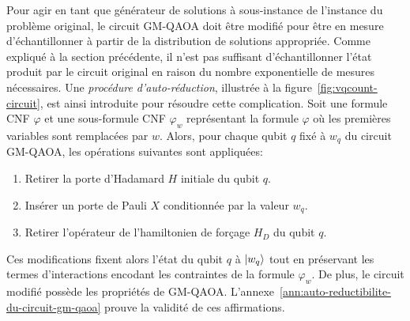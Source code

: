 Pour agir en tant que générateur de solutions à sous-instance de l'instance du problème original, le circuit GM-QAOA doit être modifié pour être en mesure d'échantillonner à partir de la distribution de solutions appropriée. Comme expliqué à la section précédente, il n'est pas suffisant d'échantillonner l'état produit par le circuit original en raison du nombre exponentielle de mesures nécessaires. Une \textit{procédure d'auto-réduction}, illustrée à la figure~\ref{fig:vqcount-circuit}, est ainsi introduite pour résoudre cette complication. Soit une formule CNF $\varphi$ et une sous-formule CNF $\varphi_{w}$ représentant la formule $\varphi$ où les premières variables sont remplacées par $w$. Alors, pour chaque qubit $q$ fixé à $w_{q}$ du circuit GM-QAOA, les opérations suivantes sont appliquées:

\begin{enumerate}[(1)]
    \item Retirer la porte d'Hadamard $H$ initiale du qubit $q$.
    \item Insérer un porte de Pauli $X$ conditionnée par la valeur $w_{q}$.
    \item Retirer l'opérateur de l'hamiltonien de forçage $H_{D}$ du qubit $q$.
\end{enumerate}

Ces modifications fixent alors l'état du qubit $q$ à $\ket{w_{q}}$ tout en préservant les termes d'interactions encodant les contraintes de la formule $\varphi_{w}$. De plus, le circuit modifié possède les propriétés de GM-QAOA. L'annexe~\ref{ann:auto-reductibilite-du-circuit-gm-qaoa} prouve la validité de ces affirmations.

